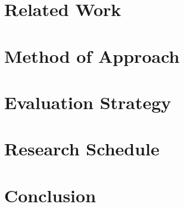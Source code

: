\documentclass[11pt]{article}
\begin{document}



\section{Related Work}
\label{sec:relatedwork}


\section{Method of Approach}
\label{sec:method}


\section{Evaluation Strategy}
\label{sec:evaluate}


\section{Research Schedule}
\label{sec:schedule}


\section{Conclusion}
\label{sec:conclusion}




\end{document}
